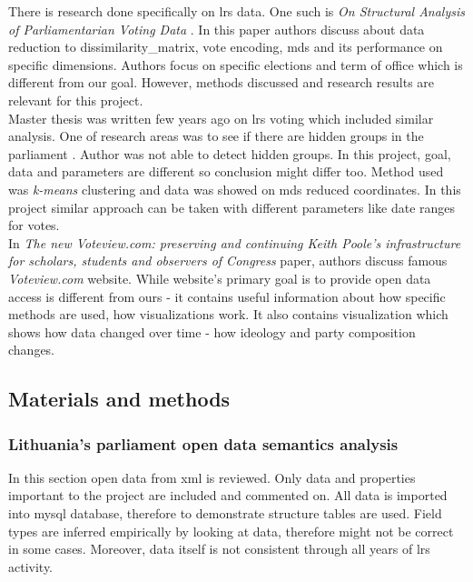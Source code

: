 \documentclass[a4paper,12pt]{article}
\begin{document}
	
	There is research done specifically on \gls{lrs} data. One such is \textit{On Structural Analysis of Parliamentarian Voting Data} \cite{DBLP:journals/informaticaLT/KrilaviciusZ08}. In this paper authors discuss about data reduction to \gls{dissimilarity_matrix}, vote encoding, \gls{mds} and its performance on specific dimensions. Authors focus on specific elections and term of office which is different from our goal. However, methods discussed and research results are relevant for this project.\\
	
	Master thesis was written few years ago on \gls{lrs} voting which included similar analysis. One of research areas was to see if there are hidden groups in the parliament \cite{vytautas_mick_magistrinis}. Author was not able to detect hidden groups. In this project, goal, data and parameters are different so conclusion might differ too. Method used was \textit{k-means} clustering and data was showed on \gls{mds} reduced coordinates. In this project similar approach can be taken with different parameters like date ranges for votes.  \\
	
	In \textit{The new Voteview.com: preserving and continuing Keith Poole’s infrastructure for scholars, students and observers of Congress} \cite{article} paper, authors discuss famous \textit{Voteview.com} website. While website's primary goal is to provide open data access is different from ours - it contains useful information about how specific methods are used, how visualizations work. It also contains visualization which shows how data changed over time - how ideology and party composition changes.
	
	
	
	
	\clearpage
	
	\subsection{Materials and methods}
	
	\subsubsection{Lithuania's parliament open data semantics analysis }
	
	In this section open data from \acrshort{xml} is reviewed. Only data and properties important to the project are included and commented on. All data is imported into \gls{mysql} database, therefore to demonstrate structure tables are used. Field types are inferred empirically by looking at data, therefore might not be correct in some cases. Moreover, data itself is not consistent through all years of \acrlong{lrs} activity.\\
	
\end{document}
